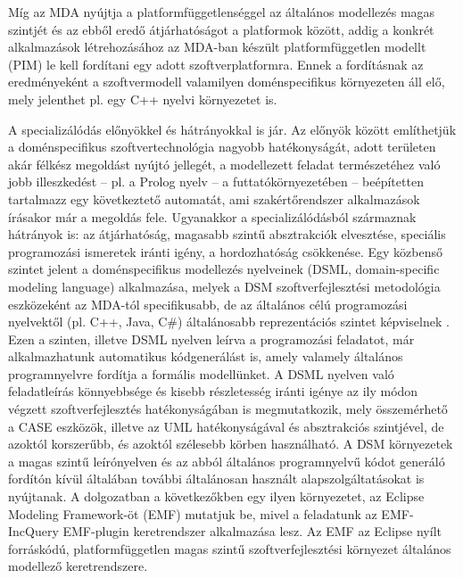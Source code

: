 Míg az \gls{MDA} nyújtja a platformfüggetlenséggel az általános modellezés magas szintjét és az ebből eredő átjárhatóságot a platformok között, addig a konkrét alkalmazások létrehozásához az \gls{MDA}-ban készült platformfüggetlen modellt (\gls{PIM}) le kell fordítani egy adott szoftverplatformra.
Ennek a fordításnak az eredményeként a szoftvermodell valamilyen doménspecifikus környezeten áll elő, mely jelenthet pl. egy C++ nyelvi környezetet is.

A specializálódás előnyökkel és hátrányokkal is jár.
Az előnyök között említhetjük a doménspecifikus szoftvertechnológia nagyobb hatékonyságát, adott területen akár félkész megoldást nyújtó jellegét, a modellezett feladat természetéhez való jobb illeszkedést -- pl. a Prolog nyelv -- a futtatókörnyezetében -- beépítetten tartalmazz egy következtető automatát, ami szakértőrendszer alkalmazások írásakor már a megoldás fele.
Ugyanakkor a specializálódásból származnak hátrányok is: az átjárhatóság, magasabb szintű absztrakciók elvesztése, speciális programozási ismeretek iránti igény, a hordozhatóság csökkenése.
Egy közbenső szintet jelent a doménspecifikus modellezés nyelveinek (\gls{DSML}, domain-specific modeling language) alkalmazása, melyek a \gls{DSM} szoftverfejlesztési metodológia eszközeként az \gls{MDA}-tól specifikusabb, de az általános célú programozási nyelvektől (pl. C++, Java, C\#) általánosabb reprezentációs szintet képviselnek \cite{wiki:DomainSpecificModeling}.
Ezen a szinten, illetve \gls{DSML} nyelven leírva a programozási feladatot, már alkalmazhatunk automatikus kódgenerálást is, amely valamely általános programnyelvre fordítja a formális modellünket.
A \gls{DSML} nyelven való feladatleírás könnyebbsége és kisebb részletesség iránti igénye az ily módon végzett szoftverfejlesztés hatékonyságában is megmutatkozik, mely összemérhető a \gls{CASE} eszközök, illetve az \gls{UML} hatékonyságával és absztrakciós szintjével, de azoktól korszerűbb, és azoktól szélesebb körben használható.
A \gls{DSM} környezetek a magas szintű leírónyelven és az abból általános programnyelvű kódot generáló fordítón kívül általában további általánosan használt alapszolgáltatásokat is nyújtanak.
A dolgozatban a következőkben egy ilyen környezetet, az Eclipse Modeling Framework-öt (\gls{EMF}) mutatjuk be, mivel a feladatunk az EMF-IncQuery EMF-plugin keretrendszer alkalmazása lesz.
Az \gls{EMF} az Eclipse nyílt forráskódú, platformfüggetlen magas szintű szoftverfejlesztési környezet általános modellező keretrendszere.


